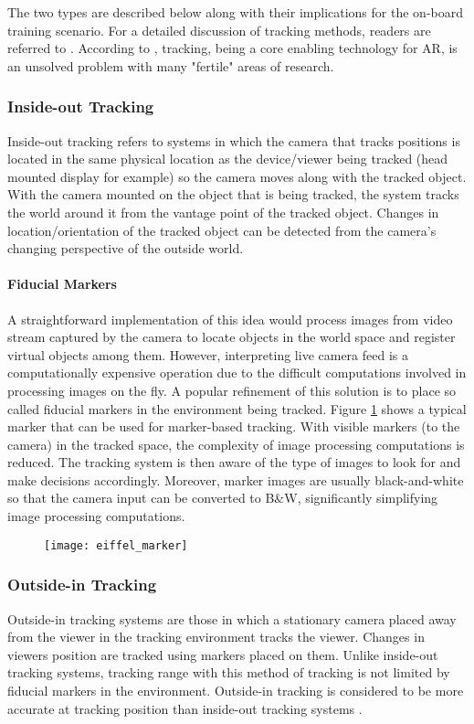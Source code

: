 The two types are described below along with their implications for the on-board training scenario. For a detailed discussion of tracking methods, readers are referred to \cite{zhou2008trends}. According to \cite{zhou2008trends}, tracking, being a core enabling technology for AR, is an unsolved problem with many "fertile" areas of research.

\subsubsection{Inside-out Tracking}
Inside-out tracking refers to systems in which the camera that tracks positions is located in the same physical location as the device/viewer being tracked (head mounted display for example) so the camera moves along with the tracked object. With the camera mounted on the object that is being tracked, the system tracks the world around it from the vantage point of the tracked object. Changes in location/orientation of the tracked object can be detected from the camera’s changing perspective of the outside world.

\paragraph{Fiducial Markers}
A straightforward implementation of this idea would process images from video stream captured by the camera to locate objects in the world space and register virtual objects among them. However, interpreting live camera feed is a computationally expensive operation due to the difficult computations involved in processing images on the fly. A popular refinement of this solution is to place so called fiducial markers in the environment being tracked. Figure \ref{fig:eiffel_marker} shows a typical marker that can be used for marker-based tracking. With visible markers (to the camera) in the tracked space, the complexity of image processing computations is reduced. The tracking system is then aware of the type of images to look for and make decisions accordingly. Moreover, marker images are usually black-and-white so that the camera input can be converted to B\&W, significantly simplifying image processing computations.

\begin{figure}[linewidth]
	\centering
	\texttt{[image: eiffel\_marker]}
	\caption{}
	\label{fig:eiffel_marker}
\end{figure}

\subsubsection{Outside-in Tracking}
Outside-in tracking systems are those in which a stationary camera placed away from the viewer in the tracking environment tracks the viewer. Changes in viewers position are tracked using markers placed on them. Unlike inside-out tracking systems, tracking range with this method of tracking is not limited by fiducial markers in the environment. Outside-in tracking is considered to be more accurate at tracking position than inside-out tracking systems \parencite{klein2006visual}.

